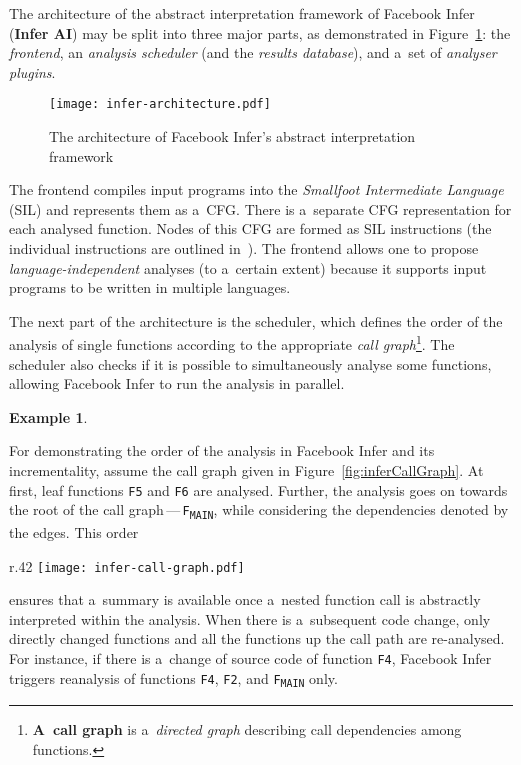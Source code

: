 \documentclass{ExcelAtFIT}
\theoremstyle{definition}
\newtheorem{example}{Example}[section]
\begin{document}
The architecture of the abstract interpretation framework of Facebook Infer (\textbf{Infer AI}) may be split into three major parts, as demonstrated in Figure~\ref{fig:inferArch}: the \emph{frontend}, an \emph{analysis scheduler} (and the \emph{results database}), and a~set of \emph{analyser plugins}.

\begin{figure}[hbt]
    \centering
    \texttt{[image: infer-architecture.pdf]}
    \caption{The architecture of Facebook Infer's abstract interpretation framework~\cite{harmimBP}}
    \label{fig:inferArch}
\end{figure}

The frontend compiles input programs into the \emph{Smallfoot Intermediate Language} (SIL) and represents them as a~CFG. There is a~separate CFG representation for each analysed function. Nodes of this CFG are formed as SIL instructions (the individual instructions are outlined in~\cite{harmimBP}). The frontend allows one to propose \emph{language-independent} analyses (to a~certain extent) because it supports input programs to be written in multiple languages.

The next part of the architecture is the scheduler, which defines the order of the analysis of single functions according to the appropriate \emph{call graph}\footnote{\textbf{A~call graph} is a~\emph{directed graph} describing call dependencies among functions.}. The scheduler also checks if it is possible to simultaneously analyse some functions, allowing Facebook Infer to run the analysis in parallel.

\begin{example}
    \label{ex:inferAnalysis}
\end{example}
\vspace{-.5em}
\noindent
For demonstrating the order of the analysis in Facebook Infer and its incrementality, assume the call graph given in Figure~\ref{fig:inferCallGraph}. At first, leaf functions \texttt{F5} and \texttt{F6} are analysed. Further, the analysis goes on towards the root of the call graph\,---\,\texttt{F\textsubscript{MAIN}}, while considering the dependencies denoted by the edges. This order
\begin{wrapfigure}{r}{.42 \linewidth}
    \centering
    \vspace{-1em}
    \texttt{[image: infer-call-graph.pdf]}
    \label{fig:inferCallGraph}
\end{wrapfigure}
ensures that a~summary is available once a~nested function call is abstractly interpreted within the analysis. When there is a~subsequent code change, only directly changed functions and all the functions up the call path are re-analysed. For instance, if there is a~change of source code of function \texttt{F4}, Facebook Infer triggers reanalysis of functions \texttt{F4}, \texttt{F2}, and \texttt{F\textsubscript{MAIN}} only.
\end{document}
